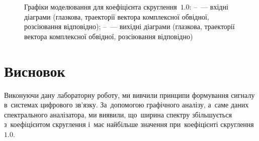 \documentclass[
	a4paper,
	oneside,
	BCOR = 10mm,
	DIV = 12,
	12pt,
	headings = normal,
]{scrartcl}
\begin{document}
\begin{figure}[!htbp]
\begin{subfigure}{\textwidth / 3}
						\caption{}
						\label{subfig:rolloff-1p0-scatter-plot-out}
					\end{subfigure}%
					\caption{Графіки моделювання для коефіцієнта скруглення~$1.0$: –~— вхідні діаграми (глазкова, траекторії вектора комплексної обвідної, розсіювання відповідно); –~— вихідні діаграми (глазкова, траекторії вектора комплексної обвідної, розсіювання відповідно)}
					\label{fig:rolloff-1p0-plots}
				\end{figure}

	\section{Висновок}
		Виконуючи дану лабораторну роботу, ми вивчили принципи формування сигналу в~системах цифрового зв'язку. За~допомогою графічного аналізу, а~саме даних спектрального аналізатора, ми виявили, що~ширина спектру збільшується з~коефіцієнтом скруглення і~має найбільше значення при~коефіцієнті скруглення~$1.0$.
\end{document}
